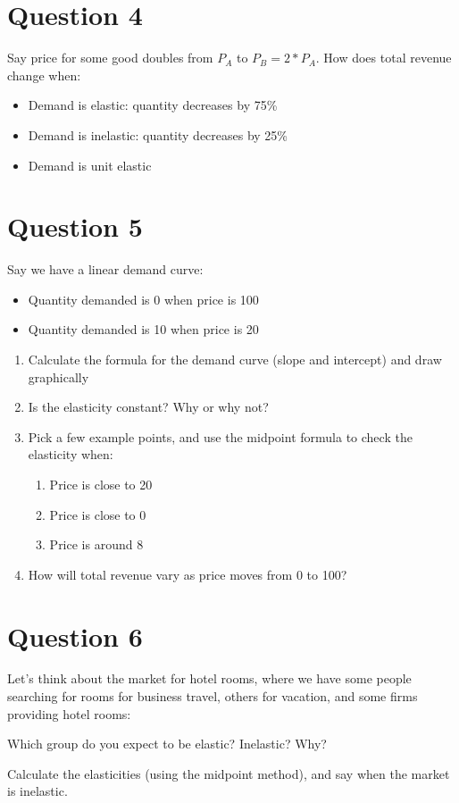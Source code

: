 \documentclass[12pt]{article}
\begin{document}
\section*{Question 4}
Say price for some good doubles from $P_A$ to $P_B = 2*P_A$. How does total revenue change when:
    \begin{itemize}
        \item Demand is elastic: quantity decreases by 75\%
        \item Demand is inelastic: quantity decreases by 25\%
        \item Demand is unit elastic
    \end{itemize}

\section*{Question 5}
Say we have a linear demand curve:
\begin{itemize}
    \item Quantity demanded is 0 when price is 100
    \item Quantity demanded is 10 when price is 20
\end{itemize}

\medskip

\begin{enumerate}
    \item Calculate the formula for the demand curve (slope and intercept) and draw graphically
    \item Is the elasticity constant? Why or why not?
    \item Pick a few example points, and use the midpoint formula to check the elasticity when:
        \begin{enumerate}
            \item Price is close to 20
            \item Price is close to 0
            \item Price is around 8
        \end{enumerate}
    \item How will total revenue vary as price moves from 0 to 100?
\end{enumerate}

\section*{Question 6}
Let's think about the market for hotel rooms, where we have some people searching for rooms for business travel, others for vacation, and some firms providing hotel rooms:

\begin{center}

\end{center}

Which group do you expect to be elastic? Inelastic? Why?

\medskip
\medskip

Calculate the elasticities (using the midpoint method), and say when the market is inelastic.
\end{document}
